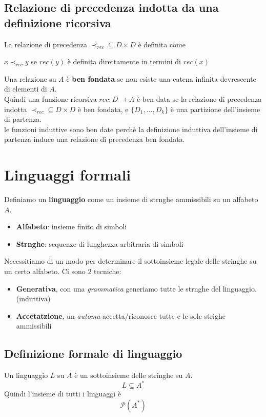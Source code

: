 \documentclass{article}
\begin{document}
\subsection{Relazione di precedenza indotta da una definizione ricorsiva}
La relazione di precedenza \(\prec_{rec} \subseteq D \times D\) è definita come
\begin{center}
    \(x \prec_{rec} y \) se \(rec(y)\) è definita direttamente in termini di \(rec(x)\)
\end{center}
Una relazione su \(A\) è \textbf{ben fondata} se non esiste una catena infinita devrescente di elementi di \(A\). \\
Quindi una funzione ricorsiva \(rec: D \rightarrow A\) è ben data se la relazione di precedenza indotta \(\prec_{rec} \subseteq D \times D\) è ben fondata, e \(\{D_1, \ldots, D_k\}\) è una partizione dell'insieme di partenza. \\
le funzioni induttive sono ben date perchè la definizione induttiva dell'insieme di partenza induce una relazione di precedenza ben fondata.
\pagebreak

\section{Linguaggi formali}
Definiamo un \textbf{linguaggio} come un insieme di strnghe ammissibili su un alfabeto \(A\).
\begin{itemize}
    \item \textbf{Alfabeto}: insieme finito di simboli
    \item \textbf{Strnghe}: sequenze di lunghezza arbitraria di simboli
\end{itemize}
Necessitiamo di un modo per determinare il sottoinsieme legale delle stringhe su un certo alfabeto. Ci sono 2 tecniche:
\begin{itemize}
    \item \textbf{Generativa}, con una \emph{grammatica} generiamo tutte le strnghe del linguaggio. (induttiva)
    \item \textbf{Accetatzione}, un \emph{automa} accetta/riconosce tutte e le sole strighe ammissibili
\end{itemize}
\subsection*{Definizione formale di linguaggio}
Un linguaggio \(L\) su \(A\) è un sottoinsieme delle stringhe su \(A\).
\[L \subseteq A^*\]
Quindi l'insieme di tutti i linguaggi è
\[\mathcal{P}(A^*)\]
\end{document}
